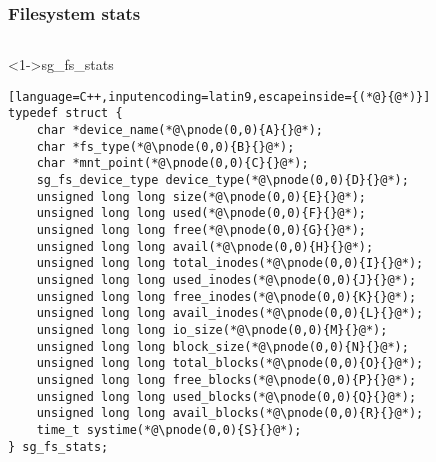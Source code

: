 \documentclass[ngerman,xcolor={table,dvipsnames},smaller,compress,hyperref={bookmarks,colorlinks}]{beamer}
\begin{document}
\begin{frame}[fragile]
\frametitle{Filesystem stats}
\begin{columns}[t]
\begin{column}{.5\textwidth}
\begin{block}<1->{sg\_fs\_stats}
\tiny
\begin{lstlisting}[language=C++,inputencoding=latin9,escapeinside={(*@}{@*)}]
typedef struct {
    char *device_name(*@\pnode(0,0){A}{}@*);
    char *fs_type(*@\pnode(0,0){B}{}@*);
    char *mnt_point(*@\pnode(0,0){C}{}@*);
    sg_fs_device_type device_type(*@\pnode(0,0){D}{}@*);
    unsigned long long size(*@\pnode(0,0){E}{}@*);
    unsigned long long used(*@\pnode(0,0){F}{}@*);
    unsigned long long free(*@\pnode(0,0){G}{}@*);
    unsigned long long avail(*@\pnode(0,0){H}{}@*);
    unsigned long long total_inodes(*@\pnode(0,0){I}{}@*);
    unsigned long long used_inodes(*@\pnode(0,0){J}{}@*);
    unsigned long long free_inodes(*@\pnode(0,0){K}{}@*);
    unsigned long long avail_inodes(*@\pnode(0,0){L}{}@*);
    unsigned long long io_size(*@\pnode(0,0){M}{}@*);
    unsigned long long block_size(*@\pnode(0,0){N}{}@*);
    unsigned long long total_blocks(*@\pnode(0,0){O}{}@*);
    unsigned long long free_blocks(*@\pnode(0,0){P}{}@*);
    unsigned long long used_blocks(*@\pnode(0,0){Q}{}@*);
    unsigned long long avail_blocks(*@\pnode(0,0){R}{}@*);
    time_t systime(*@\pnode(0,0){S}{}@*);
} sg_fs_stats;
\end{lstlisting}
\end{block}
\end{column}


\end{columns}
\end{frame}
\end{document}

